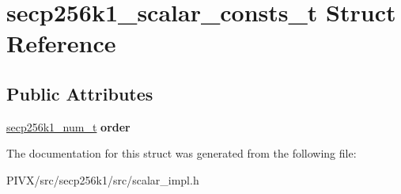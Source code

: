 \hypertarget{structsecp256k1__scalar__consts__t}{}\section{secp256k1\+\_\+scalar\+\_\+consts\+\_\+t Struct Reference}
\label{structsecp256k1__scalar__consts__t}
\subsection*{Public Attributes}
\begin{DoxyCompactItemize}
\item 
\mbox{\label{structsecp256k1__scalar__consts__t_afe571b5fdc44a3ea42bfb9a5409a7ea4}} 
\mbox{\hyperlink{structsecp256k1__num__t}{secp256k1\+\_\+num\+\_\+t}} {\bfseries order}
\end{DoxyCompactItemize}


The documentation for this struct was generated from the following file\+:\begin{DoxyCompactItemize}
\item 
P\+I\+V\+X/src/secp256k1/src/scalar\+\_\+impl.\+h\end{DoxyCompactItemize}
